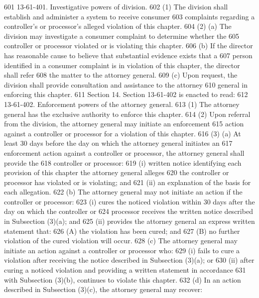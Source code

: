 601          13-61-401. Investigative powers of division.
602          (1) The division shall establish and administer a system to receive consumer
603     complaints regarding a controller's or processor's alleged violation of this chapter.
604          (2) (a) The division may investigate a consumer complaint to determine whether the
605     controller or processor violated or is violating this chapter.
606          (b) If the director has reasonable cause to believe that substantial evidence exists that a
607     person identified in a consumer complaint is in violation of this chapter, the director shall refer
608     the matter to the attorney general.
609          (c) Upon request, the division shall provide consultation and assistance to the attorney
610     general in enforcing this chapter.
611          Section 14. Section 13-61-402 is enacted to read:
612          13-61-402. Enforcement powers of the attorney general.
613          (1) The attorney general has the exclusive authority to enforce this chapter.
614          (2) Upon referral from the division, the attorney general may initiate an enforcement
615     action against a controller or processor for a violation of this chapter.
616          (3) (a) At least 30 days before the day on which the attorney general initiates an
617     enforcement action against a controller or processor, the attorney general shall provide the
618     controller or processor:
619          (i) written notice identifying each provision of this chapter the attorney general alleges
620     the controller or processor has violated or is violating; and
621          (ii) an explanation of the basis for each allegation.
622          (b) The attorney general may not initiate an action if the controller or processor:
623          (i) cures the noticed violation within 30 days after the day on which the controller or
624     processor receives the written notice described in Subsection (3)(a); and
625          (ii) provides the attorney general an express written statement that:
626          (A) the violation has been cured; and
627          (B) no further violation of the cured violation will occur.
628          (c) The attorney general may initiate an action against a controller or processor who:
629          (i) fails to cure a violation after receiving the notice described in Subsection (3)(a); or
630          (ii) after curing a noticed violation and providing a written statement in accordance
631     with Subsection (3)(b), continues to violate this chapter.
632          (d) In an action described in Subsection (3)(c), the attorney general may recover:

